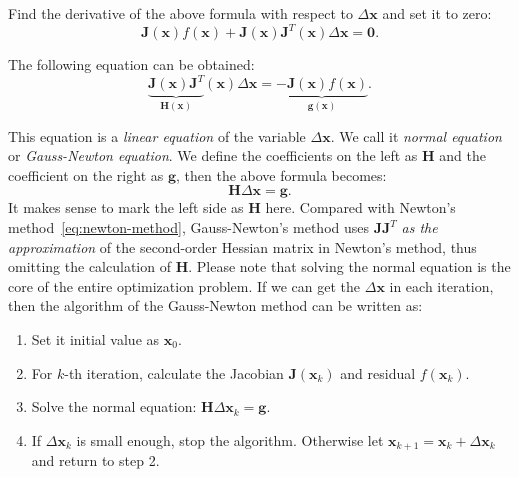 Find the derivative of the above formula with respect to $\Delta \mathbf{x}$ and set it to zero:
\begin{displaymath}
    \mathbf{J} {\left( \mathbf{x} \right)}f\left( \mathbf{x} \right) + \mathbf{J} {\left( \mathbf{x} \right)} \mathbf{J}^T \left( \mathbf{x} \right)\Delta \mathbf{x} = \mathbf{0}.
\end{displaymath}

The following equation can be obtained:
\begin{equation}
    \underbrace{\mathbf{J} {\left( \mathbf{x} \right)} \mathbf{J}^T}_{\mathbf{H}(\mathbf{x})} \left( \mathbf{x} \right)\Delta \mathbf{x} =  \underbrace{- \mathbf{J} {\left( \mathbf{x} \right)} f\left( \mathbf{x} \right)}_{\mathbf{g}(\mathbf{x})}.
\end{equation}

This equation is a \textit{linear equation} of the variable $\Delta \mathbf{x}$. We call it \textit{normal equation} or \textit{Gauss-Newton equation}. We define the coefficients on the left as $\mathbf{H}$ and the coefficient on the right as $\mathbf{g}$, then the above formula becomes:
\begin{equation}
    \label{eq:minimize-deltax}
    \mathbf{H} \Delta \mathbf{x} = \mathbf{g}.
\end{equation}
It makes sense to mark the left side as $\mathbf{H}$ here. Compared with Newton's method~\ref{eq:newton-method}, Gauss-Newton's method uses $\mathbf{J}\mathbf{J}^T$ \textit{as the approximation} of the second-order Hessian matrix in Newton's method, thus omitting the calculation of $\mathbf{H}$. Please note that solving the normal equation is the core of the entire optimization problem. If we can get the $\Delta \mathbf{x}$ in each iteration, then the algorithm of the Gauss-Newton method can be written as:

\begin{mdframed}
    \begin{enumerate}
        \item Set it initial value as $\mathbf{x}_0$.
        \item For $k$-th iteration, calculate the Jacobian $\mathbf{J}(\mathbf{x}_k)$ and residual $f(\mathbf{x}_k)$.
        \item Solve the normal equation: $\mathbf{H} \Delta \mathbf{x}_k = \mathbf{g}$.
        \item If $\Delta \mathbf{x}_k$ is small enough, stop the algorithm. Otherwise let $\mathbf{x}_{k+1} = \mathbf{x}_k+\Delta \mathbf{x}_k$ and return to step 2.
    \end{enumerate}
\end{mdframed}

